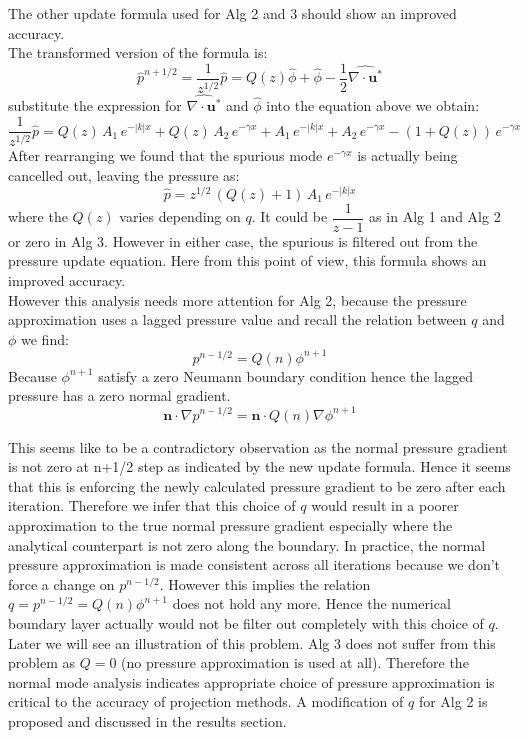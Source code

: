 The other update formula used for Alg 2 and 3 should show an improved accuracy.\\
The transformed version of the formula is:
\begin{equation}
\hat{p}^{n+1/2} = \dfrac{1}{z^{1/2}}\hat{p} = Q(z)\hat{\phi} + \hat{\phi} - \dfrac{1}{2}\hat{\nabla \cdot \textbf{u}^*}
\end{equation}
substitute the expression for $\hat{\nabla \cdot \textbf{u}^*}$ and $\hat{\phi}$ into the equation above we obtain:
\begin{equation}
\dfrac{1}{z^{1/2}}\hat{p} = Q(z)\,A_1\,e^{-|k|x} + Q(z)\,A_2 \,e^{-\gamma x} + A_1\,e^{-|k|x} + A_2 \,e^{-\gamma x} - (1+Q(z)) \,e^{-\gamma x}
\end{equation}
After rearranging we found that the spurious mode $e^{-\gamma x}$ is actually being cancelled out, leaving the pressure as:
\begin{equation}
\hat{p} = z^{1/2}\,(Q(z) + 1)\,A_1\,e^{-|k|x} 
\end{equation}
where the $Q(z)$ varies depending on $q$. It could be $\dfrac{1}{z-1}$ as in Alg 1 and Alg 2 or zero in Alg 3. However in either case, the spurious is filtered out from the pressure update equation. Here from this point of view, this formula shows an improved accuracy.\\

However this analysis needs more attention for Alg 2, because the pressure approximation uses a lagged pressure value and recall the relation between $q$ and $\phi$ we find:
\begin{equation*}
p^{n-1/2} = Q(n)\phi^{n+1}
\end{equation*}
Because $\phi^{n+1}$ satisfy a zero Neumann boundary condition hence the lagged pressure has a zero normal gradient.
\begin{equation}
\textbf{n}\cdot \nabla p^{n-1/2} = \textbf{n}\cdot Q(n)\nabla \phi^{n+1}
\end{equation}

This seems like to be a contradictory observation as the normal pressure gradient is not zero at n+1/2 step as indicated by the new update formula. Hence it seems that this is enforcing the newly calculated pressure gradient to be zero after each iteration. Therefore we infer that this choice of $q$ would result in a poorer approximation to the true normal pressure gradient especially where the analytical counterpart is not zero along the boundary. In practice, the normal pressure approximation is made consistent across all iterations because we don't force a change on $p^{n-1/2}$. However this implies the relation $q = p^{n-1/2}= Q(n)\phi^{n+1}$ does not hold any more. Hence the numerical boundary layer actually would not be filter out completely with this choice of $q$. Later we will see an illustration of this problem. Alg 3 does not suffer from this problem as $Q = 0$ (no pressure approximation is used at all). Therefore the normal mode analysis indicates appropriate choice of pressure approximation is critical to the accuracy of projection methods. A modification of $q$ for Alg 2 is proposed and discussed in the results section.\\

